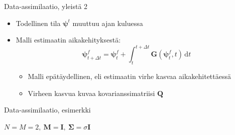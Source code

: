 \documentclass{beamer}
\begin{document}
\begin{frame}{Data-assimilaatio, yleistä 2}

\begin{itemize}
\item Todellinen tila $\boldsymbol{\psi}^t$ muuttuu ajan kuluessa
\item Malli estimaatin aikakehityksestä:
\[
\boldsymbol{\psi}^f_{t+\Delta t} = \boldsymbol{\psi}^f_t + \int_{t}^{t+\Delta t} \! \boldsymbol{G}(\boldsymbol{\psi}^f_t,t) \, \mathrm{d}t
\]
\begin{itemize}
\item Malli epätäydellinen, eli estimaatin virhe kasvaa aikakehitettäessä
\item Virheen kasvua kuvaa kovarianssimatriisi $\mathbf{Q}$
\end{itemize}
\end{itemize}

\end{frame}

\begin{frame}{Data-assimilaatio, esimerkki}

$N=M=2,~\mathbf{M} = \mathbf{I},~\boldsymbol{\Sigma} = \sigma\mathbf{I}$

\begin{figure}
\end{figure}

\end{frame}
\end{document}
